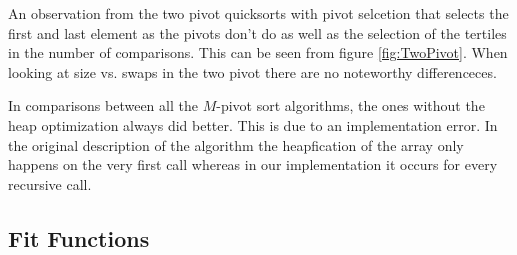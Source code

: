 		

		
		An observation from the two pivot quicksorts with pivot selcetion that selects the first and last element as the pivots don't do as well as the selection of the tertiles in the number of comparisons. This can be seen from figure \ref{fig:TwoPivot}. When looking at size vs. swaps in the two pivot there are no noteworthy differenceces. 
		
		
		

		In comparisons between all the $M$-pivot sort algorithms, the ones without the heap optimization always did better. This is due to an implementation error. In the original description of the algorithm the heapfication of the array only happens on the very first call whereas in our implementation it occurs for every recursive call.


	\subsection{Fit Functions}
		
